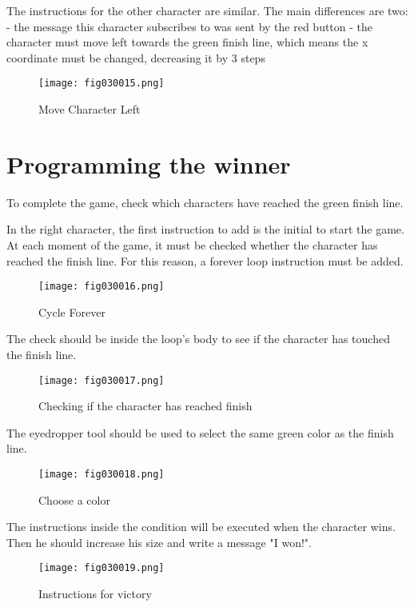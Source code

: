 The instructions for the other character are similar. The main differences are two:
- the message this character subscribes to was sent by the red button
- the character must move left towards the green finish line, which means the x coordinate must be changed, decreasing it by 3 steps

\begin{figure}[H]
   \centering
   \texttt{[image: fig030015.png]}
   \caption{Move Character Left}
\label{fig030015}
\end{figure}

\section{Programming the winner}
To complete the game, check which characters have reached the green finish line.

In the right character, the first instruction to add is the initial to start the game. At each moment of the game, it must be checked whether the character has reached the finish line. For this reason, a forever loop instruction must be added.

\begin{figure}[H]
   \centering
   \texttt{[image: fig030016.png]}
   \caption{Cycle Forever}
\label{fig030016}
\end{figure}

The check should be inside the loop's body to see if the character has touched the finish line.

\begin{figure}[H]
   \centering
   \texttt{[image: fig030017.png]}
   \caption{Checking if the character has reached finish}
\label{fig030017}
\end{figure}

The eyedropper tool should be used to select the same green color as the finish line.

\begin{figure}[H]
   \centering
   \texttt{[image: fig030018.png]}
   \caption{Choose a color}
\label{fig030018}
\end{figure}

The instructions inside the condition will be executed when the character wins. Then he should increase his size and write a message "I won!".

\begin{figure}[H]
   \centering
   \texttt{[image: fig030019.png]}
   \caption{Instructions for victory}
\label{fig030019}
\end{figure}


